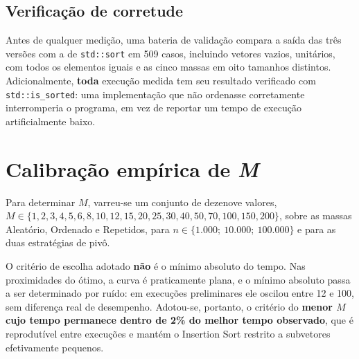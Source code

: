 \subsection{Verificação de corretude}

Antes de qualquer medição, uma bateria de validação compara a saída das três versões
com a de \texttt{std::sort} em 509 casos, incluindo vetores vazios, unitários, com
todos os elementos iguais e as cinco massas em oito tamanhos distintos.
Adicionalmente, \textbf{toda} execução medida tem seu resultado verificado com
\texttt{std::is\_sorted}: uma implementação que não ordenasse corretamente
interromperia o programa, em vez de reportar um tempo de execução artificialmente
baixo.

\section{Calibração empírica de \textit{M}}
\label{sec:calibracao}

Para determinar $M$, varreu-se um conjunto de dezenove valores,
$M \in \{1, 2, 3, 4, 5, 6, 8, 10, 12, 15, 20, 25, 30, 40, 50, 70, 100, 150, 200\}$,
sobre as massas Aleatório, Ordenado e Repetidos, para $n \in \{1.000;\ 10.000;\
100.000\}$ e para as duas estratégias de pivô.

O critério de escolha adotado \textbf{não} é o mínimo absoluto do tempo. Nas
proximidades do ótimo, a curva é praticamente plana, e o mínimo absoluto passa a ser
determinado por ruído: em execuções preliminares ele oscilou entre 12 e 100, sem
diferença real de desempenho. Adotou-se, portanto, o critério do \textbf{menor $M$
cujo tempo permanece dentro de 2\% do melhor tempo observado}, que é reprodutível
entre execuções e mantém o Insertion Sort restrito a subvetores efetivamente
pequenos.
